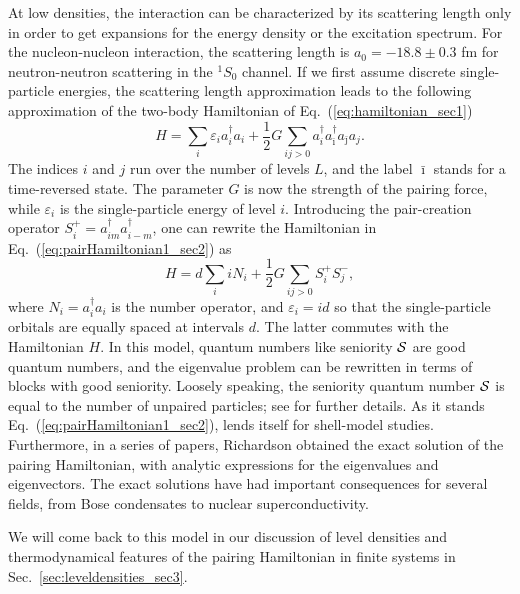 \documentclass[preprint,rmp,aps,floatfix]{revtex4}
\begin{document}
At low densities, the interaction can be characterized by its 
scattering length only in order to get expansions for the energy
density or the excitation spectrum. For the nucleon-nucleon
interaction, the 
scattering length is 
$a_0=-18.8\pm 0.3$ fm for  
neutron-neutron scattering in the $^1S_0$ channel.
If we first assume discrete single-particle
energies, 
the scattering length approximation leads to the following
approximation of the two-body
Hamiltonian of Eq.~(\ref{eq:hamiltonian_sec1}) 
\begin{equation}
   H=\sum_i \varepsilon_i a^{\dagger}_i a_i +\frac{1}{2} G\sum_{ij>0}
           a^{\dagger}_{i}
     a^{\dagger}_{\bar{\imath}}a_{\bar{\jmath}}a_{j}.
     \label{eq:pairHamiltonian1_sec2}
\end{equation}
The indices $i$ and $j$ run 
over the number of levels $L$, and the label $\bar{\imath}$ stands 
for a time-reversed state. The parameter $G$ is now the 
strength of the pairing force, while $\varepsilon_i$ is the single-particle 
energy of level $i$. 
Introducing the pair-creation operator 
$S^+_i=a^{\dagger}_{im}a^{\dagger}_{i-m}$,
one can rewrite the Hamiltonian in 
Eq.\ (\ref{eq:pairHamiltonian1_sec2}) as
\begin{equation}
   H=d\sum_iiN_i+
     \frac{1}{2} G\sum_{ij>0}S^+_iS^-_j,
     \label{eq:pairH2_sec}
\end{equation}
where  $N_i=a^{\dagger}_i a_i$
is the number operator, and 
$\varepsilon_i = id$ so that the single-particle orbitals 
are equally spaced at intervals $d$. The latter commutes with the 
Hamiltonian $H$. In this model, quantum numbers like seniority 
$\cal{S}$ are good quantum numbers, and the eigenvalue problem 
can be rewritten in terms of blocks with good seniority. Loosely 
speaking, the seniority quantum number $\cal{S}$ is equal to 
the number of unpaired particles; see  \cite{talmi93} for 
further details. As it stands 
Eq.~(\ref{eq:pairHamiltonian1_sec2}), lends itself for shell-model
studies. 
Furthermore, in  a series of papers, Richardson 
\cite{richardson1,richardson2,richardson3,richardson4,richardson5,richardson6,richardson7} obtained the exact solution of the pairing Hamiltonian, with 
analytic expressions for the eigenvalues and eigenvectors. The exact solutions
have had important consequences for several fields, from Bose condensates to
nuclear superconductivity.
 
We will come back to this model 
in our discussion of level densities
and thermodynamical features of the pairing Hamiltonian in
finite systems in Sec.~\ref{sec:leveldensities_sec3}. 
\end{document}
